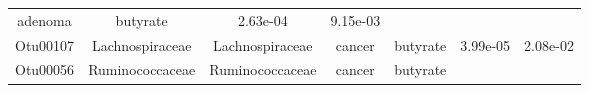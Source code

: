 \documentclass[11pt,]{article}
\begin{document}
\begin{longtable}[]{@{}ccccccc@{}}
\begin{minipage}[t]{0.09\columnwidth}
adenoma\strut
\end{minipage} & \begin{minipage}[t]{0.11\columnwidth}\centering\strut
butyrate\strut
\end{minipage} & \begin{minipage}[t]{0.09\columnwidth}\centering\strut
2.63e-04\strut
\end{minipage} & \begin{minipage}[t]{0.09\columnwidth}\centering\strut
9.15e-03\strut
\end{minipage}\tabularnewline
\begin{minipage}[t]{0.09\columnwidth}\centering\strut
Otu00107\strut
\end{minipage} & \begin{minipage}[t]{0.17\columnwidth}\centering\strut
Lachnospiraceae\strut
\end{minipage} & \begin{minipage}[t]{0.17\columnwidth}\centering\strut
Lachnospiraceae\strut
\end{minipage} & \begin{minipage}[t]{0.09\columnwidth}\centering\strut
cancer\strut
\end{minipage} & \begin{minipage}[t]{0.11\columnwidth}\centering\strut
butyrate\strut
\end{minipage} & \begin{minipage}[t]{0.09\columnwidth}\centering\strut
3.99e-05\strut
\end{minipage} & \begin{minipage}[t]{0.09\columnwidth}\centering\strut
2.08e-02\strut
\end{minipage}\tabularnewline
\begin{minipage}[t]{0.09\columnwidth}\centering\strut
Otu00056\strut
\end{minipage} & \begin{minipage}[t]{0.17\columnwidth}\centering\strut
Ruminococcaceae\strut
\end{minipage} & \begin{minipage}[t]{0.17\columnwidth}\centering\strut
Ruminococcaceae\strut
\end{minipage} & \begin{minipage}[t]{0.09\columnwidth}\centering\strut
cancer\strut
\end{minipage} & \begin{minipage}[t]{0.11\columnwidth}\centering\strut
butyrate\strut
\end{minipage} & \begin{minipage}[t]{0.09\columnwidth}\centering\strut

\end{minipage}
\end{longtable}
\end{document}
